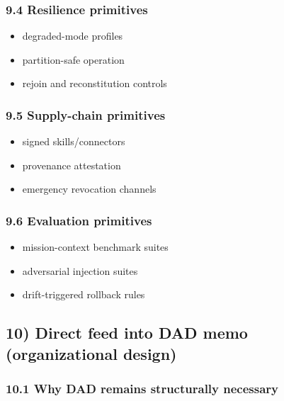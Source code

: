 \documentclass[11pt]{article}
\begin{document}
\hypertarget{resilience-primitives}{%
\subsubsection{9.4 Resilience primitives}\label{resilience-primitives}}

\begin{itemize}
\tightlist
\item
  degraded-mode profiles
\item
  partition-safe operation
\item
  rejoin and reconstitution controls
\end{itemize}

\hypertarget{supply-chain-primitives}{%
\subsubsection{9.5 Supply-chain
primitives}\label{supply-chain-primitives}}

\begin{itemize}
\tightlist
\item
  signed skills/connectors
\item
  provenance attestation
\item
  emergency revocation channels
\end{itemize}

\hypertarget{evaluation-primitives}{%
\subsubsection{9.6 Evaluation primitives}\label{evaluation-primitives}}

\begin{itemize}
\tightlist
\item
  mission-context benchmark suites
\item
  adversarial injection suites
\item
  drift-triggered rollback rules
\end{itemize}

\hypertarget{direct-feed-into-dad-memo-organizational-design}{%
\subsection{10) Direct feed into DAD memo (organizational
design)}\label{direct-feed-into-dad-memo-organizational-design}}

\hypertarget{why-dad-remains-structurally-necessary}{%
\subsubsection{10.1 Why DAD remains structurally
necessary}\label{why-dad-remains-structurally-necessary}}
\end{document}
